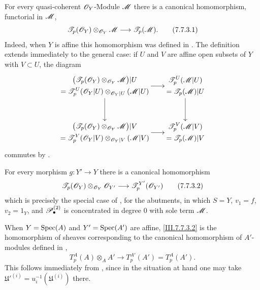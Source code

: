 \begin{env}[7.7.3]
\label{III.7.7.3}
For every quasi-coherent $\mathscr{O}_Y$-Module $\mathscr{M}$ there is
a canonical homomorphism, functorial in $\mathscr{M}$,
\[
  \mathscr{T}_p(\mathscr{O}_Y)
  \otimes_{\mathscr{O}_Y}\mathscr{M}
  \longrightarrow
  \mathscr{T}_p(\mathscr{M}).
  \tag{7.7.3.1}\label{III.7.7.3.1}
\]
Indeed, when $Y$ is affine this homomorphism was defined in
.  The definition extends immediately to
the general case: if $U$ and $V$ are affine open subsets of
$Y$ with $V\subset U$, the diagram
\[
\xymatrix@C=18pt@R=32pt{
  {\begin{gathered}
    \bigl(\sh{T}_p(\sh{O}_Y)
      \otimes_{\sh{O}_Y}\sh{M}\bigr)|U\\
    =
    \sh{T}^U_p(\sh{O}_Y|U)
      \otimes_{\sh{O}_Y|U}(\sh{M}|U)
  \end{gathered}}
  \ar[r]\ar[d]
  &
  {\begin{gathered}
    \sh{T}^U_p(\sh{M}|U)\\
    =\sh{T}_p(\sh{M})|U
  \end{gathered}}
  \ar[d]
  \\
  {\begin{gathered}
    \bigl(\sh{T}_p(\sh{O}_Y)
      \otimes_{\sh{O}_Y}\sh{M}\bigr)|V\\
    =
    \sh{T}^V_p(\sh{O}_Y|V)
      \otimes_{\sh{O}_Y|V}(\sh{M}|V)
  \end{gathered}}
  \ar[r]
  &
  {\begin{gathered}
    \sh{T}^V_p(\sh{M}|V)\\
    =\sh{T}_p(\sh{M})|V
  \end{gathered}}
}
\]
commutes by .

For every morphism $g:Y'\to Y$ there is a canonical
homomorphism
\[
  \mathscr{T}_p(\mathscr{O}_Y)
  \otimes_{\mathscr{O}_Y}\mathscr{O}_{Y'}
  \longrightarrow
  \mathscr{T}^{Y'}_p(\mathscr{O}_{Y'})
  \tag{7.7.3.2}\label{III.7.7.3.2}
\]
which is precisely the special case of
, for the abutments, in which
$S=Y$, $v_1=f$, $v_2=1_Y$, and
$\mathscr{P}^{(2)}_\bullet$ is concentrated in degree $0$ with
sole term $\mathscr{M}$.

When $Y=\operatorname{Spec}(A)$ and $Y'=\operatorname{Spec}(A')$ are affine,
\eqref{III.7.7.3.2} is the homomorphism of sheaves
corresponding to the canonical homomorphism of $A'$-modules
defined in ,
\[
  T^A_p(A)\otimes_A A'
  \longrightarrow
  T^{A'}_p(A')
  =
  T^A_p(A').
\]
This follows immediately from , since in
the situation at hand one may take
$\mathfrak U'^{(i)}=u_i^{-1}(\mathfrak U^{(i)})$ there.
\end{env}

